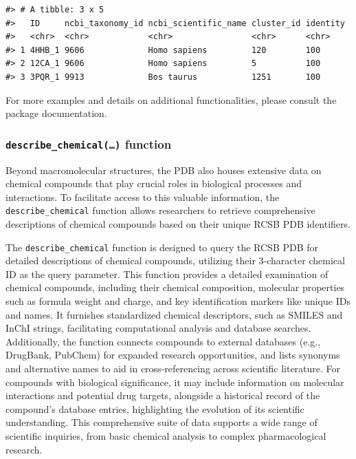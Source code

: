 \begin{verbatim}
#> # A tibble: 3 x 5
#>   ID     ncbi_taxonomy_id ncbi_scientific_name cluster_id identity
#>   <chr>  <chr>            <chr>                <chr>      <chr>   
#> 1 4HHB_1 9606             Homo sapiens         120        100     
#> 2 12CA_1 9606             Homo sapiens         5          100     
#> 3 3PQR_1 9913             Bos taurus           1251       100
\end{verbatim}

For more examples and details on additional functionalities, please consult the package documentation.

\subsubsection{\texorpdfstring{\texttt{describe\_chemical(…)} function}{describe\_chemical(\ldots) function}}\label{describe_chemical-function}

Beyond macromolecular structures, the PDB also houses extensive data on chemical compounds that play crucial roles in biological processes and interactions. To facilitate access to this valuable information, the \texttt{describe\_chemical} function allows researchers to retrieve comprehensive descriptions of chemical compounds based on their unique RCSB PDB identifiers.

The \texttt{describe\_chemical} function is designed to query the RCSB PDB for detailed descriptions of chemical compounds, utilizing their 3-character chemical ID as the query parameter. This function provides a detailed examination of chemical compounds, including their chemical composition, molecular properties such as formula weight and charge, and key identification markers like unique IDs and names. It furnishes standardized chemical descriptors, such as SMILES and InChI strings, facilitating computational analysis and database searches. Additionally, the function connects compounds to external databases (e.g., DrugBank, PubChem) for expanded research opportunities, and lists synonyms and alternative names to aid in cross-referencing across scientific literature. For compounds with biological significance, it may include information on molecular interactions and potential drug targets, alongside a historical record of the compound's database entries, highlighting the evolution of its scientific understanding. This comprehensive suite of data supports a wide range of scientific inquiries, from basic chemical analysis to complex pharmacological research.

